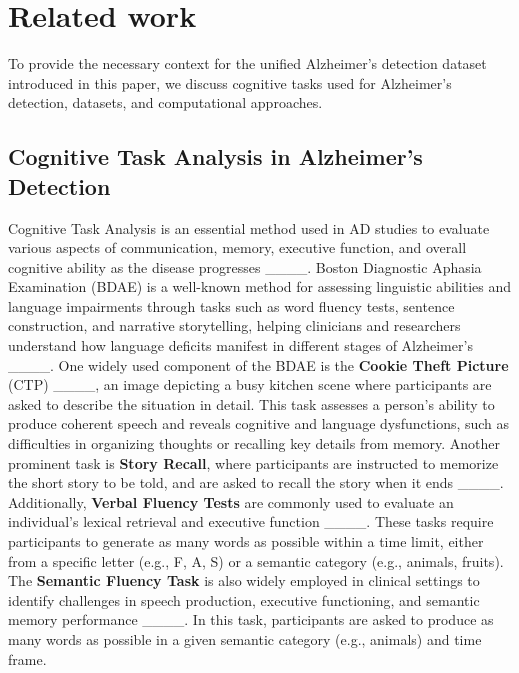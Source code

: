 \section{Related work}
\label{sec:related}

To provide the necessary context for the unified Alzheimer's detection dataset introduced in this paper, we discuss cognitive tasks used for Alzheimer's detection, datasets, and computational approaches.

\subsection{Cognitive Task Analysis in Alzheimer's Detection}
    
Cognitive Task Analysis is an essential method used in AD studies to evaluate various aspects of communication, memory, executive function, and overall cognitive ability as the disease progresses ____. Boston Diagnostic Aphasia Examination (BDAE) is a well-known method for assessing linguistic abilities and language impairments through tasks such as word fluency tests, sentence construction, and narrative storytelling, helping clinicians and researchers understand how language deficits manifest in different stages of Alzheimer's ____. One widely used component of the BDAE is the \textbf{Cookie Theft Picture} (CTP) ____, an image depicting a busy kitchen scene where participants are asked to describe the situation in detail. This task assesses a person's ability to produce coherent speech and reveals cognitive and language dysfunctions, such as difficulties in organizing thoughts or recalling key details from memory.
Another prominent task is \textbf{Story Recall}, where participants are instructed to memorize the short story to be told, and are asked to recall the story when it ends ____. Additionally, \textbf{Verbal Fluency Tests} are commonly used to evaluate an individual’s lexical retrieval and executive function ____. These tasks require participants to generate as many words as possible within a time limit, either from a specific letter (e.g., F, A, S) or a semantic category (e.g., animals, fruits). The \textbf{Semantic Fluency Task} is also widely employed in clinical settings to identify challenges in speech production, executive functioning, and semantic memory performance ____. In this task, participants are asked to produce as many words as possible in a given semantic category (e.g., animals) and time frame. 


  



